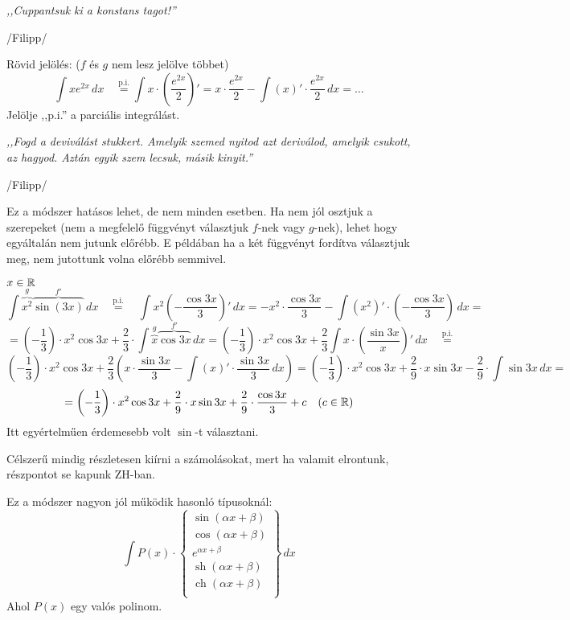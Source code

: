 \documentclass[a4paper,11.5pt]{article}
\DeclareMathOperator{\sh}{sh}
\DeclareMathOperator{\ch}{ch}
\begin{document}
	\begin{center}
		\textit{,,Cuppantsuk ki a konstans tagot!''}
		\smallskip
		
		/Filipp/
	\end{center}
	\bigskip
	
	\begin{note}
		Rövid jelölés: ($f$ és $g$ nem lesz jelölve többet)
		\[ \int xe^{2x}\,dx\quad \overset{\text{p.i.}}{=}\int x\cdot\left( \frac{e^{2x}}{2}\right)'=x\cdot\frac{e^{2x}}{2}-\int(x)'\cdot\frac{e^{2x}}{2}\,dx=\ldots \]
		Jelölje ,,p.i.'' a parciális integrálást.
	\end{note}
	\begin{center}
		\textit{,,Fogd a deviválást stukkert. Amelyik szemed nyitod azt deriválod, amelyik csukott, az hagyod. Aztán egyik szem lecsuk, másik kinyit.''}
		
		\smallskip
		/Filipp/
	\end{center}
	\begin{note}
		Ez a módszer hatásos lehet, de nem minden esetben. Ha nem jól osztjuk a szerepeket (nem a megfelelő függvényt választjuk $f$-nek vagy $g$-nek), lehet hogy egyáltalán nem jutunk előrébb. E példában ha a két függvényt fordítva választjuk meg, nem jutottunk volna előrébb semmivel.
	\end{note}
	\begin{task}$x\in\mathbb{R}$
		\[ \int \overbrace{x^2}^{g}\overbrace{\sin(3x)}^{f'}\,dx \quad \overset{\text{p.i.}}{=}\quad  \int x^2\left(-\frac{\cos3x}{3}\right)'\,dx=-x^2\cdot\frac{\cos3x}{3}-\int\left(x^2\right)'\cdot\left(-\frac{\cos3x}{3}\right)\,dx=\]
		\[=\left(-\frac{1}{3}\right)\cdot x^2\cos3x+\frac{2}{3}\cdot\int \overbrace{x}^{g}\overbrace{\cos3x}^{f'}\,dx=\left(-\frac{1}{3}\right)\cdot x^2\cos3x+\frac{2}{3}\int x\cdot\left( \frac{\sin3x}{x}\right)'\,dx\quad \overset{\text{p.i.}}{=} \]
		\[  \left(-\frac{1}{3}\right)\cdot x^2\cos3x+\frac{2}{3}\left(x\cdot\frac{\sin3x}{3}-\int(x)'\cdot\frac{\sin3x}{3}\,dx\right)=\left(-\frac{1}{3}\right)\cdot x^2\cos3x+\frac{2}{9}\cdot x\sin3x-\frac{2}{9}\cdot\int\sin3x\,dx=\]
		\[=\left(-\frac{1}{3}\right) \cdot x^2\cos3x+\frac{2}{9}\cdot
		x\sin3x+\frac{2}{9}\cdot\frac{\cos3x}{3} + c\quad (c\in\mathbb{R}) \]
		Itt egyértelműen érdemesebb volt $\sin$-t választani.
	\end{task}
	\begin{note}
		Célszerű mindig részletesen kiírni a számolásokat, mert ha valamit elrontunk, részpontot se kapunk ZH-ban.
	\end{note}
	\begin{note}
		Ez a módszer nagyon jól működik hasonló típusoknál:
		\[ \int P(x)\cdot
		\left.\begin{cases}
			\sin(\alpha x+\beta)\\
			\cos(\alpha x+\beta)\\
			e^{\alpha x+\beta}\\
			\sh(\alpha x+\beta)\\
			\ch(\alpha x+\beta)\\
		\end{cases}\right\}\,dx \]
		Ahol $P(x)$ egy valós polinom.
	\end{note}
\end{document}

